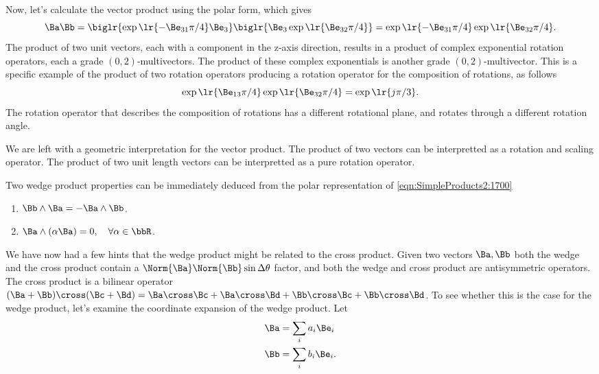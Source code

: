 {Now, let's calculate the vector product using the polar form, which gives
\begin{dmath}\label{eqn:products:1960}
\Ba \Bb =
\biglr{
   \exp\lr{ -\Be_{31} \pi/4 } \Be_3 }
\biglr{
   \Be_3 \exp\lr{ \Be_{32} \pi/4 }
}
=
\exp\lr{ -\Be_{31} \pi/4 }
\exp\lr{ \Be_{32} \pi/4 }.
\end{dmath}
The product of two unit vectors, each with a component in the z-axis direction, results in a product of complex exponential rotation operators, each a
grade \((0,2)\)-multivectors.  The product of these complex exponentials is another grade \((0,2)\)-multivector.  This is a specific example of the product of two rotation operators producing a
rotation operator for the composition of rotations, as follows
\begin{dmath}\label{eqn:products:1980}
\exp\lr{ \Be_{13} \pi/4 }
\exp\lr{ \Be_{32} \pi/4 } = \exp\lr{ j \pi/3 }.
\end{dmath}
The rotation operator that describes the composition of rotations has a different rotational plane, and rotates through a different rotation angle.

We are left with a geometric interpretation for the vector product.  The product of two vectors can be interpretted as a rotation and scaling operator.
The product of two unit length vectors can be interpretted as a pure rotation operator.
} %

Two wedge product properties can be immediately deduced from the polar representation of \cref{eqn:SimpleProducts2:1700}

\begin{enumerate}
\item \( \Bb \wedge \Ba = - \Ba \wedge \Bb \).
\item \( \Ba \wedge (\alpha \Ba) = 0, \quad \forall \alpha \in \bbR \).
\end{enumerate}

We have now had a few hints that the wedge product might be related to the cross product.  Given two vectors \( \Ba, \Bb \) both the wedge and the cross product contain a \( \Norm{\Ba} \Norm{\Bb} \sin \Delta \theta \) factor, and both the wedge and cross product are antisymmetric operators.
The cross product is a bilinear operator \( (\Ba + \Bb) \cross (\Bc + \Bd) =
\Ba \cross \Bc + \Ba \cross \Bd +
\Bb \cross \Bc + \Bb \cross \Bd \).  To see whether this is the case for the wedge product, let's examine the coordinate expansion of the wedge product.  Let
\begin{dmath}\label{eqn:products:1160}
\begin{aligned}
\Ba &= \sum_i a_i \Be_i \\
\Bb &= \sum_i b_i \Be_i.
\end{aligned}
\end{dmath}

